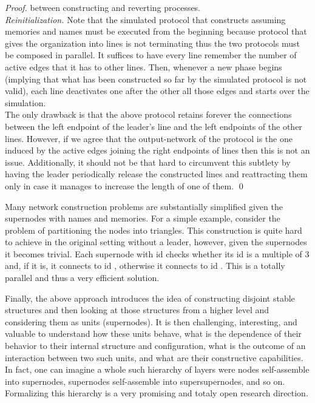 \documentclass[oribibl, 11pt]{llncs}
\begin{document}
\begin{proof}
between constructing and reverting processes.\\

\vspace{-3pt}
\emph{Reinitialization.} Note that the simulated protocol that constructs  assuming memories and names must be executed from the beginning because protocol  that gives the organization into lines is not terminating thus the two protocols must be composed in parallel. It suffices to have every line remember the number of active edges that it has to other lines. Then, whenever a new phase begins (implying that what has been constructed so far by the simulated protocol is not valid), each line deactivates one after the other all those edges and starts over the simulation.\\

\vspace{-3pt}
The only drawback is that the above protocol retains forever the connections between the left endpoint of the leader's line and the left endpoints of the other lines. However, if we agree that the output-network of the protocol is the one induced by the active edges joining the right endpoints of lines then this is not an issue. Additionally, it should not be that hard to circumvent this subtlety by having the leader periodically release the constructed lines and reattracting them only in case it manages to increase the length of one of them.
\qed
\end{proof}

Many network construction problems are substantially simplified given the supernodes with names and memories. For a simple example, consider the problem of partitioning the nodes into triangles. This construction is quite hard to achieve in the original setting without a leader, however, given the supernodes it becomes trivial. Each supernode with id  checks whether its id is a multiple of 3 and, if it is, it connects to id , otherwise it connects to id . This is a totally parallel and thus a very efficient solution.

Finally, the above approach introduces the idea of constructing disjoint stable structures and then looking at those structures from a higher level and considering them as units (supernodes). It is then challenging, interesting, and valuable to understand how these units behave, what is the dependence of their behavior to their internal structure and configuration, what is the outcome of an interaction between two such units, and what are their constructive capabilities. In fact, one can imagine a whole such hierarchy of layers were nodes self-assemble into supernodes, supernodes self-assemble into supersupernodes, and so on. Formalizing this hierarchy is a very promising and totaly open research direction.
\end{document}
